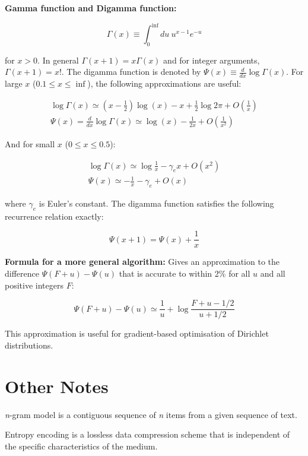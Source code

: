 \textbf{Gamma function and Digamma function: }

\begin{equation}
\Gamma(x)\equiv\int_{0}^{\inf}du\ u^{x-1}e^{-u}
\end{equation}

\noindent for $x>0$. In general $\Gamma(x+1)=x\Gamma(x)$ and for integer arguments, $\Gamma(x+1)=x!$. The digamma function is denoted by $\Psi(x)\equiv\frac{d}{dx}\log\Gamma(x)$. For large $x$ ($0.1\leq x \leq \inf$), the following approximations are useful:

\begin{equation}
\begin{split}
\log\Gamma(x) \simeq (x-\frac{1}{2})\log(x)-x+\frac{1}{2}\log2\pi+O(\frac{1}{x})
\\
\Psi(x) = \frac{d}{dx}\log\Gamma(x)\simeq \log(x)-\frac{1}{2x}+O(\frac{1}{x^{2}})
\end{split}
\end{equation}

\noindent And for small $x$ ($0\leq x \leq 0.5$):

\begin{equation}
\begin{split}
\log \Gamma(x) \simeq \log\frac{1}{x}-\gamma_{e}x+O(x^{2})
\\
\Psi(x)\simeq-\frac{1}{x}-\gamma_{e}+O(x)
\end{split}
\end{equation}

\noindent where $\gamma_{e}$ is Euler's constant. The digamma function satisfies the following recurrence relation exactly:

\begin{equation}
\Psi(x+1)=\Psi(x)+\frac{1}{x}
\end{equation}

\textbf{Formula for a more general algorithm: }Gives an approximation to the difference $\Psi(F+u)-\Psi(u)$ that is accurate to within 2\% for all $u$ and all positive integers $F$:

\begin{equation}
\Psi(F+u)-\Psi(u)\simeq\frac{1}{u}+\log\frac{F+u-1/2}{u+1/2}
\end{equation}

\noindent This approximation is useful for gradient-based optimisation of Dirichlet distributions.

\section{Other Notes}

\textit{n}-gram model is a contiguous sequence of \textit{n} items from a given sequence of text.

\null
\noindent Entropy encoding is a lossless data compression scheme that is independent of the specific characteristics of the medium.

